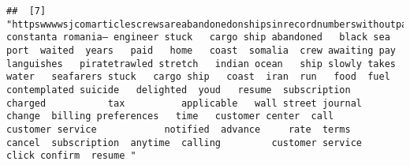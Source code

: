 \documentclass[
]{article}
\begin{document}
\begin{verbatim}
##  [7] "httpswwwwsjcomarticlescrewsareabandonedonshipsinrecordnumberswithoutpayfoodorawayhome constanta romania— engineer stuck   cargo ship abandoned   black sea port  waited  years   paid   home   coast  somalia  crew awaiting pay languishes   piratetrawled stretch   indian ocean   ship slowly takes  water   seafarers stuck   cargo ship   coast  iran  run   food  fuel  contemplated suicide   delighted  youd   resume  subscription    charged           tax          applicable   wall street journal           change  billing preferences   time   customer center  call         customer service            notified  advance     rate  terms           cancel  subscription  anytime  calling         customer service         click confirm  resume "                                                                                                                                                                                                                                                                                                                                                                                                                                                                                                                                                                                                                                                                                                                                                                                                                                                                                                                                                                                                                                                                                                                                                                                                                                                                                                                                                                                                                                                                                                                                                                                                                                                                                                                                                                                                                                                                                                                                                                                                                                                                                                                                                                                                                                                                                                                                                                                                                                                                                                                                                                                                                                                                           
\end{verbatim}
\end{document}
